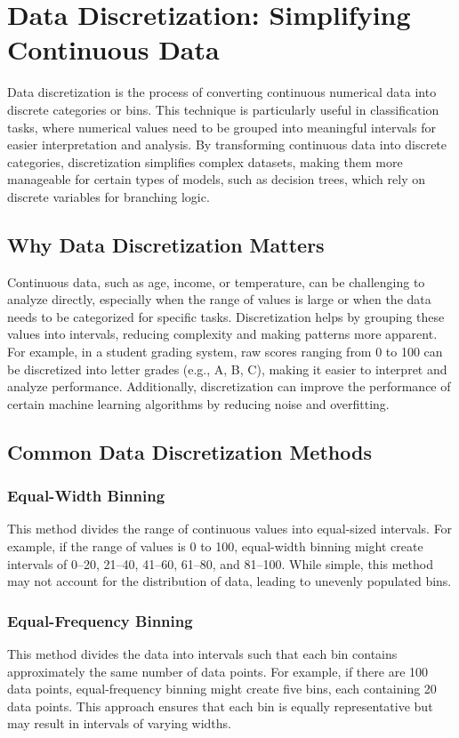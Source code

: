\documentclass[12pt]{article}
\begin{document}
\section{Data Discretization: Simplifying Continuous Data}

Data discretization is the process of converting continuous numerical data into discrete categories or bins. This technique is particularly useful in classification tasks, where numerical values need to be grouped into meaningful intervals for easier interpretation and analysis. By transforming continuous data into discrete categories, discretization simplifies complex datasets, making them more manageable for certain types of models, such as decision trees, which rely on discrete variables for branching logic.

\subsection{Why Data Discretization Matters}

Continuous data, such as age, income, or temperature, can be challenging to analyze directly, especially when the range of values is large or when the data needs to be categorized for specific tasks. Discretization helps by grouping these values into intervals, reducing complexity and making patterns more apparent. For example, in a student grading system, raw scores ranging from 0 to 100 can be discretized into letter grades (e.g., A, B, C), making it easier to interpret and analyze performance. Additionally, discretization can improve the performance of certain machine learning algorithms by reducing noise and overfitting.

\subsection{Common Data Discretization Methods}

\subsubsection{Equal-Width Binning}
This method divides the range of continuous values into equal-sized intervals. For example, if the range of values is 0 to 100, equal-width binning might create intervals of 0–20, 21–40, 41–60, 61–80, and 81–100. While simple, this method may not account for the distribution of data, leading to unevenly populated bins.

\subsubsection{Equal-Frequency Binning}
This method divides the data into intervals such that each bin contains approximately the same number of data points. For example, if there are 100 data points, equal-frequency binning might create five bins, each containing 20 data points. This approach ensures that each bin is equally representative but may result in intervals of varying widths.
\end{document}
